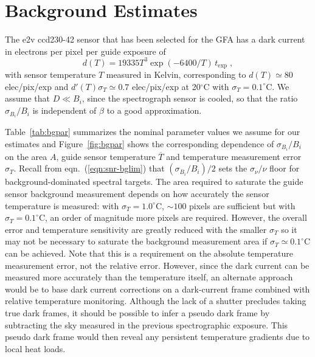 \documentclass[11pt]{article}
\providecommand{\eqn}[1]{eqn.~(\ref{eqn:#1})}
\providecommand{\tab}[1]{Table~\ref{tab:#1}}
\providecommand{\fig}[1]{Figure~\ref{fig:#1}}
\begin{document}
\section{Background Estimates}

The e2v ccd230-42 sensor that has been selected for the GFA has a dark current in electrons per pixel per guide exposure of
\begin{equation}
d(T) = 19335 T^3 \exp(-6400/T)\,t_{\text{exp}} \; ,
\end{equation}
with sensor temperature $T$ measured in Kelvin, corresponding to $d(T) \simeq 80$ elec/pix/exp and $d'(T)\sigma_T \simeq 0.7$ elec/pix/exp at 20$^\circ$C with $\sigma_T = 0.1^\circ$C. We assume that $D \ll B_i$, since the spectrograph sensor is cooled, so that the ratio $\sigma_{B_i}/B_i$ is independent of $\beta$ to a good approximation.

\tab{bgpar} summarizes the nominal parameter values we assume for our estimates and \fig{bgpar} shows the corresponding dependence of $\sigma_{B_i}/B_i$ on the area $A$, guide sensor temperature $\overline{T}$ and temperature measurement error $\sigma_T$. Recall from \eqn{snr-bglim} that $(\sigma_{B_i}/B_i)/2$ sets the $\sigma_{\nu}/\nu$ floor for background-dominated spectral targets. The area required to saturate the guide sensor background measurement depends on how accurately the sensor temperature is measured: with $\sigma_T = 1.0^\circ$C, $\sim 100$ pixels are sufficient but with $\sigma_T = 0.1^\circ$C, an order of magnitude more pixels are required. However, the overall error and temperature sensitivity are greatly reduced with the smaller $\sigma_T$ so it may not be necessary to saturate the background measurement area if $\sigma_T \simeq 0.1^\circ$C can be achieved. Note that this is a requirement on the absolute temperature measurement error, not the relative error. However, since the dark current can be measured more accurately than the temperature itself, an alternate approach would be to base dark current corrections on a dark-current frame combined with relative temperature monitoring.  Although the lack of a shutter precludes taking true dark frames, it should be possible to infer a pseudo dark frame by subtracting the sky measured in the previous spectrographic exposure. This pseudo dark frame would then reveal any persistent temperature gradients due to local heat loads.
\end{document}
